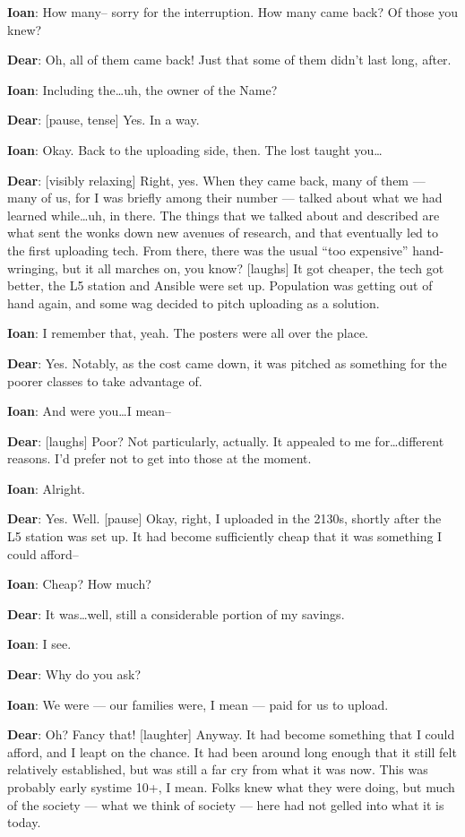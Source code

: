 \textbf{Ioan}: How many-- sorry for the interruption. How many came back? Of those you knew?

\textbf{Dear}: Oh, all of them came back! Just that some of them didn't last long, after.

\textbf{Ioan}: Including the\ldots{}uh, the owner of the Name?

\textbf{Dear}: {[}pause, tense{]} Yes. In a way.

\textbf{Ioan}: Okay. Back to the uploading side, then. The lost taught you\ldots{}

\textbf{Dear}: {[}visibly relaxing{]} Right, yes. When they came back, many of them — many of us, for I was briefly among their number — talked about what we had learned while\ldots{}uh, in there. The things that we talked about and described are what sent the wonks down new avenues of research, and that eventually led to the first uploading tech. From there, there was the usual ``too expensive'' hand-wringing, but it all marches on, you know? {[}laughs{]} It got cheaper, the tech got better, the L5 station and Ansible were set up. Population was getting out of hand again, and some wag decided to pitch uploading as a solution.

\textbf{Ioan}: I remember that, yeah. The posters were all over the place.

\textbf{Dear}: Yes. Notably, as the cost came down, it was pitched as something for the poorer classes to take advantage of.

\textbf{Ioan}: And were you\ldots{}I mean--

\textbf{Dear}: {[}laughs{]} Poor? Not particularly, actually. It appealed to me for\ldots{}different reasons. I'd prefer not to get into those at the moment.

\textbf{Ioan}: Alright.

\textbf{Dear}: Yes. Well. {[}pause{]} Okay, right, I uploaded in the 2130s, shortly after the L5 station was set up. It had become sufficiently cheap that it was something I could afford--

\textbf{Ioan}: Cheap? How much?

\textbf{Dear}: It was\ldots{}well, still a considerable portion of my savings.

\textbf{Ioan}: I see.

\textbf{Dear}: Why do you ask?

\textbf{Ioan}: We were — our families were, I mean — paid for us to upload.

\textbf{Dear}: Oh? Fancy that! {[}laughter{]} Anyway. It had become something that I could afford, and I leapt on the chance. It had been around long enough that it still felt relatively established, but was still a far cry from what it was now. This was probably early systime 10+, I mean. Folks knew what they were doing, but much of the society — what we think of society — here had not gelled into what it is today.

